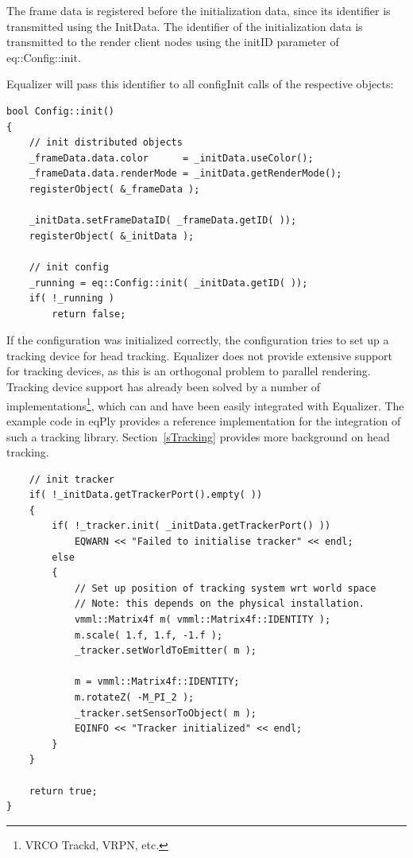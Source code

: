 \documentclass[10pt,a4]{scrartcl}
\newcommand{\sref}[1]{Section~\ref{#1}}
\begin{document}
The frame data is registered before the initialization data, since its
identifier is transmitted using the \textsf{InitData}. The identifier of
the initialization data is transmitted to the render client nodes using
the \textsf{initID} parameter of \textsf{eq::Config::init}.

Equalizer will pass this identifier to all \textsf{configInit} calls of
the respective objects:

{\footnotesize\begin{lstlisting}
bool Config::init()
{
    // init distributed objects
    _frameData.data.color      = _initData.useColor();
    _frameData.data.renderMode = _initData.getRenderMode();
    registerObject( &_frameData );

    _initData.setFrameDataID( _frameData.getID( ));
    registerObject( &_initData );

    // init config
    _running = eq::Config::init( _initData.getID( ));
    if( !_running )
        return false;
\end{lstlisting}}

If the configuration was initialized correctly, the configuration tries
to set up a tracking device for head tracking. Equalizer does not
provide extensive support for tracking devices, as this is an orthogonal
problem to parallel rendering. Tracking device support has already been
solved by a number of implementations\footnote{VRCO Trackd, VRPN, etc.},
which can and have been easily integrated with Equalizer. The example
code in \textsf{eqPly} provides a reference implementation for the
integration of such a tracking library. \sref{sTracking} provides more
background on head tracking.

{\footnotesize\begin{lstlisting}
    // init tracker
    if( !_initData.getTrackerPort().empty( ))
    {
        if( !_tracker.init( _initData.getTrackerPort() ))
            EQWARN << "Failed to initialise tracker" << endl;
        else
        {
            // Set up position of tracking system wrt world space
            // Note: this depends on the physical installation.
            vmml::Matrix4f m( vmml::Matrix4f::IDENTITY );
            m.scale( 1.f, 1.f, -1.f );
            _tracker.setWorldToEmitter( m );

            m = vmml::Matrix4f::IDENTITY;
            m.rotateZ( -M_PI_2 );
            _tracker.setSensorToObject( m );
            EQINFO << "Tracker initialized" << endl;
        }
    }

    return true;
}
\end{lstlisting}}%
\end{document}
